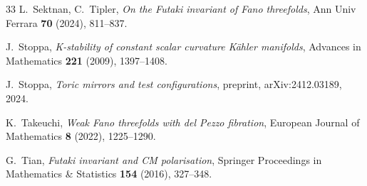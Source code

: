 \documentclass[12pt]{amsart}
\theoremstyle{definition}
\theoremstyle{remark}
\begin{document}
\begin{thebibliography}{33}
L.~Sektnan, C.~Tipler, \textit{On the Futaki invariant of Fano threefolds}, Ann Univ Ferrara \textbf{70} (2024), 811--837.

J.~Stoppa, \textit{K-stability of constant scalar curvature K\"ahler manifolds}, Advances in Mathematics \textbf{221} (2009), 1397--1408.

J.~Stoppa, \textit{Toric mirrors and test configurations}, preprint, arXiv:2412.03189, 2024.

K.~Takeuchi, \textit{Weak Fano threefolds with del Pezzo fibration},  European Journal of Mathematics \textbf{8} (2022), 1225--1290.

G.~Tian, \textit{Futaki invariant and {CM} polarisation}, Springer Proceedings in Mathematics \& Statistics \textbf{154} (2016), 327--348.



\end{thebibliography}
\end{document}
